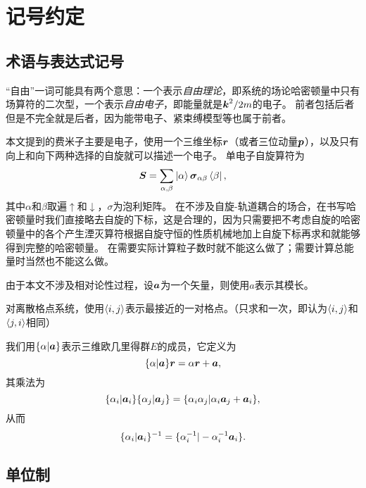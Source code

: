 \section*{记号约定}

\subsection*{术语与表达式记号}

“自由”一词可能具有两个意思：一个表示\emph{自由理论}，即系统的场论哈密顿量中只有场算符的二次型，一个表示\emph{自由电子}，即能量就是$\vb*{k}^2/2m$的电子。
前者包括后者但是不完全就是后者，因为能带电子、紧束缚模型等也属于前者。

本文提到的费米子主要是电子，使用一个三维坐标$\vb*{r}$（或者三位动量$\vb*{p}$），以及只有向上和向下两种选择的自旋就可以描述一个电子。
单电子自旋算符为
\begin{equation}
    {\vb*{S}} = \sum_{\alpha, \beta} \ket{\alpha} \vb*{\sigma}_{\alpha \beta} \bra{\beta},
\end{equation}
其中$\alpha$和$\beta$取遍$\uparrow$和$\downarrow$，$\sigma$为泡利矩阵。
在不涉及自旋-轨道耦合的场合，在书写哈密顿量时我们直接略去自旋的下标，这是合理的，因为只需要把不考虑自旋的哈密顿量中的各个产生湮灭算符根据自旋守恒的性质机械地加上自旋下标再求和就能够得到完整的哈密顿量。
在需要实际计算粒子数时就不能这么做了；需要计算总能量时当然也不能这么做。

由于本文不涉及相对论性过程，设$\vb*{a}$为一个矢量，则使用$a$表示其模长。

对离散格点系统，使用$\langle i, j \rangle$表示最接近的一对格点。（只求和一次，即认为$\langle i, j \rangle$和$\langle j, i \rangle$相同）

我们用$\{\alpha | \vb*{a} \}$表示三维欧几里得群$E$的成员，它定义为
\begin{equation}
    \{\alpha | \vb*{a} \} \vb*{r} = \alpha \vb*{r} + \vb*{a},
\end{equation}
其乘法为
\begin{equation}
    \{\alpha_i | \vb*{a}_i \} \{\alpha_j | \vb*{a}_j \} = \{ \alpha_i \alpha_j | \alpha_i \vb*{a}_j + \vb*{a}_i \},
\end{equation}
从而
\begin{equation}
    \{\alpha_i | \vb*{a}_i \}^{-1} = \{ \alpha_i^{-1} | - \alpha_i^{-1} \vb*{a}_i \}.
\end{equation}

\subsection*{单位制}

